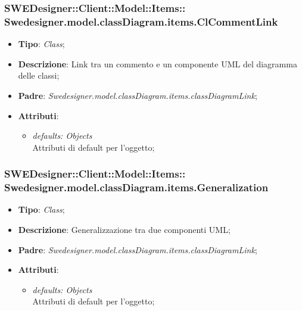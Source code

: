 \documentclass[../DefinizioneDiProdotto.tex]{subfiles}
\begin{document}
			\subsubsection[Swedesigner.model.classDiagram.items.ClCommentLink]{SWEDesigner::Client::Model::Items::\\Swedesigner.model.classDiagram.items.ClCommentLink}
			\hypertarget{SWEDesigner::Client::Model::Items::Swedesigner.model.classDiagram.items.ClCommentLink}{}
			\begin{itemize}
				\item \textbf{Tipo}: \emph{Class};
				\item \textbf{Descrizione}: Link tra un commento e un componente UML del diagramma delle classi;
				\item \textbf{Padre}: \emph{Swedesigner.model.classDiagram.items.classDiagramLink};
				\item \textbf{Attributi}:
				\begin{itemize}
					\item \emph{defaults: Objects}\\
					Attributi di default per l'oggetto;
				\end{itemize}
			\end{itemize}
			\subsubsection[Swedesigner.model.classDiagram.items.Generalization]{SWEDesigner::Client::Model::Items::\\Swedesigner.model.classDiagram.items.Generalization}
			\hypertarget{SWEDesigner::Client::Model::Items::Swedesigner.model.classDiagram.items.Generalization}{}
			\begin{itemize}
				\item \textbf{Tipo}: \emph{Class};
				\item \textbf{Descrizione}: Generalizzazione tra due componenti UML;
				\item \textbf{Padre}: \emph{Swedesigner.model.classDiagram.items.classDiagramLink};
				\item \textbf{Attributi}:
				\begin{itemize}
					\item \emph{defaults: Objects}\\
					Attributi di default per l'oggetto;
				\end{itemize}
			\end{itemize}
\end{document}
